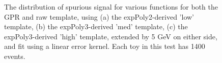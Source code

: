 \begin{figure} 
\begin{center}

\caption{The distribution of spurious signal for various functions for both the GPR and raw template, using (a) the expPoly2-derived 'low' template, (b) the expPoly3-derived 'med' template, (c) the expPoly3-derived 'high' template, extended by 5 GeV on either side, and fit using a linear error kernel. Each toy in this test has 1400 events.}
\label{fig:linearkernel_lowpt_1400_noSig}
\end{center}
\end{figure}

